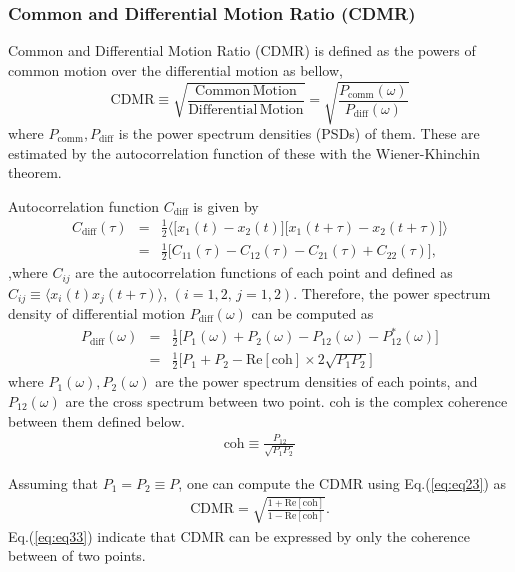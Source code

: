 \subsubsection{Common and Differential Motion Ratio (CDMR)}
Common and Differential Motion Ratio (CDMR) is defined as the powers of common motion over the differential motion as bellow,
\begin{equation}
  \mathrm{CDMR} \equiv \sqrt{\frac{\mathrm{Common\,Motion}}{\mathrm{Differential\,Motion}}} = \sqrt{\frac{P_{\mathrm{comm}}(\omega)}{P_{\mathrm{diff}}(\omega)}} \label{eq:eq23}
\end{equation}
where $P_{\mathrm{comm}},P_{\mathrm{diff}}$ is the power spectrum densities (PSDs) of them. These are estimated by the autocorrelation function of these with the Wiener-Khinchin theorem.

Autocorrelation function $C_{\mathrm{diff}}$ is given by
\begin{eqnarray}
  C_{\mathrm{diff}}(\tau) &=& \frac{1}{2}
  \biggl\langle
  \biggl[ x_{1}(t)-x_{2}(t) \biggr] \biggl[ x_{1}(t+\tau)-x_{2}(t+\tau) \biggr]
  \biggr\rangle \\
  &=& \frac{1}{2}\biggl[ C_{11}(\tau) - C_{12}(\tau) - C_{21}(\tau) + C_{22}(\tau) \biggr], 
\end{eqnarray}
,where $C_{ij}$ are the autocorrelation functions of each point and defined as $ C_{ij} \equiv \langle x_{i}(t)x_{j}(t+\tau)\rangle,\, (i=1,2,\,j=1,2)$. Therefore, the power spectrum density of differential motion $P_{\mathrm{diff}}(\omega)$ can be computed as
\begin{eqnarray}
  P_{\mathrm{diff}}(\omega) &=& \frac{1}{2}\biggl[ P_{1}(\omega) + P_{2}(\omega) - P_{12}(\omega) - P_{12}^*(\omega) \biggr]\\
  &=& \frac{1}{2} \biggl[ P_{1}+P_{2} - \mathrm{Re}\left[\mathrm{coh} \right]\times2\sqrt{P_{1}P_{2}} \biggr] \label{eq:eq31}
\end{eqnarray}
where $P_{1}(\omega),P_{2}(\omega)$ are the power spectrum densities of each points, and $P_{12}(\omega)$ are the cross spectrum between two point. $\mathrm{coh}$ is the complex coherence between them defined below.
\begin{eqnarray}
  \mathrm{coh} \equiv \frac{P_{12}}{\sqrt{P_{1}P_{2}}}
\end{eqnarray}

Assuming that $P_{1}=P_{2} \equiv P$, one can compute the CDMR using Eq.(\ref{eq:eq23}) as
\begin{eqnarray}
 \mathrm{CDMR} = \sqrt{\frac{1 + \mathrm{Re} \left[\mathrm{coh} \right] }{1 - \mathrm{Re} \left[\mathrm{coh} \right]}}. \label{eq:eq33}
\end{eqnarray}
Eq.(\ref{eq:eq33}) indicate that CDMR can be expressed by only the coherence between of two points.

